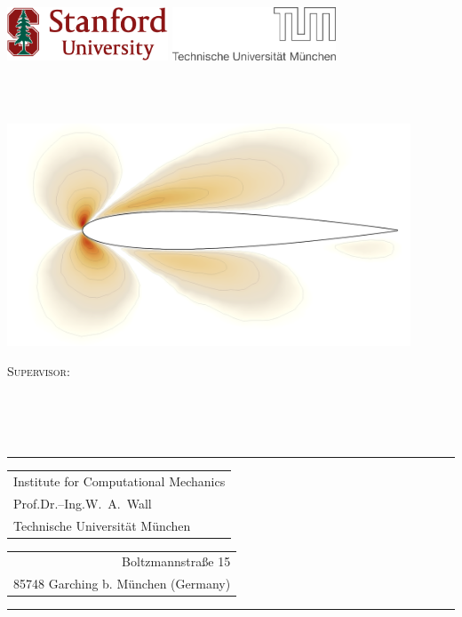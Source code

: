 \begin{titlepage}
\thispagestyle{empty}
\vspace{-1.5cm}
\includegraphics[height=1.5772cm]{./fig/stanford-logo.png}
\hfill
\includegraphics[height=1.5772cm]{./fig/tum_black.eps}
\vfill

\begin{center}
\Huge{\thesistitle}
\\
\vspace{0.2cm}
\LARGE{\Author}
\\
\vspace{0.2cm}
\large{\thesistype}
\end{center}
\vspace{0.1cm}
%
\begin{center}
\includegraphics[width=12cm]{fig/titlepage_figure4}
\end{center}
%
\vfill
%
\begin{minipage}[c]{1.0\textwidth}
\centering
{\large \scshape Supervisor:}\\
{\Supervisor}\\ %
\texttt{\Mail}\\
\end{minipage}
%
\vspace{1cm}\\
%
\rule{\textwidth}{1pt}
%
\begin{tabular}[t]{l}
Institute for Computational Mechanics
\\
  Prof.\@ Dr.--Ing.\@ W.\ A.\ Wall
\\
Technische Universit\"at M\"unchen
\end{tabular}
\hfill
\begin{tabular}[t]{r}
\\
Boltzmannstra\ss e 15
\\
85748 Garching b. M\"unchen (Germany)\\
\end{tabular}
\rule{\textwidth}{1pt}


\end{titlepage}